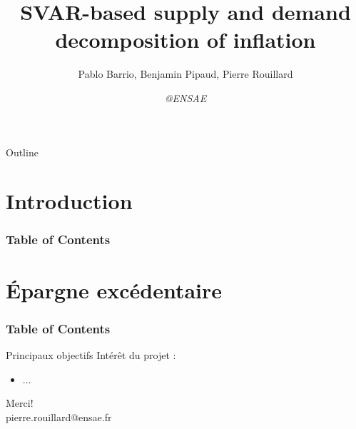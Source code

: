 \documentclass[9pt, xcolor={dvipsnames}]{beamer}
\author{Pablo Barrio, Benjamin Pipaud, Pierre Rouillard}
\title{SVAR-based supply and demand decomposition of inflation}
\institute{xx/xx/xxxx}
\date{\textit{@ENSAE}}
\begin{document}
\begin{frame}[plain]
\titlepage
\centering
\end{frame}

\begin{frame}{Outline}
  \tableofcontents
\end{frame}

\section{Introduction}
\begin{frame}
  \frametitle{Table of Contents}
  \tableofcontents[currentsection]
\end{frame}
\begin{frame}  
\end{frame}


\section{Épargne excédentaire}
\begin{frame}
  \frametitle{Table of Contents}
  \tableofcontents[currentsection]
\end{frame}
\begin{frame}{Principaux objectifs}
  Intérêt du projet :
  \begin{itemize}
    \item ...
  \end{itemize}
\end{frame}

\begin{frame}
 \begin{center}
		{\Huge Merci!}\\
		\bigskip\bigskip %
		{\LARGE pierre.rouillard@ensae.fr}
	\end{center}
\end{frame}
\end{document}
